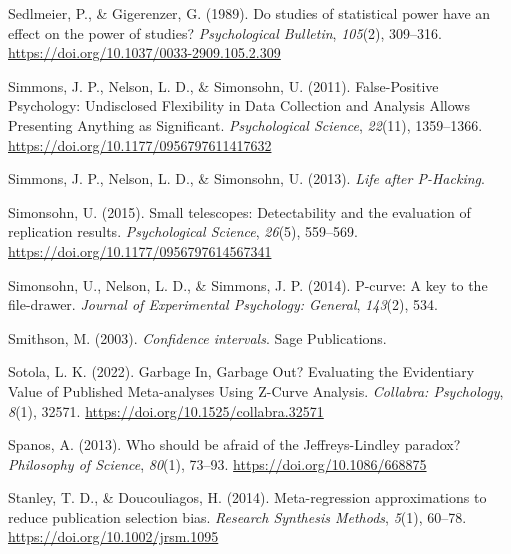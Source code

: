 \documentclass[
  letterpaper,
  DIV=11,
  numbers=noendperiod]{scrreprt}
\newlength{\cslhangindent}
\newlength{\cslentryspacingunit} %
\newenvironment{CSLReferences}[2] %
 {%
  \setlength{\parindent}{0pt}
  \ifodd #1
  \let\oldpar\par
  \def\par{\hangindent=\cslhangindent\oldpar}
  \fi
  \setlength{\parskip}{#2\cslentryspacingunit}
 }%
 {}
\begin{document}
\begin{CSLReferences}{1}{0}
\leavevmode{}%
Sedlmeier, P., \& Gigerenzer, G. (1989). Do studies of statistical power
have an effect on the power of studies? \emph{Psychological Bulletin},
\emph{105}(2), 309--316.
\url{https://doi.org/10.1037/0033-2909.105.2.309}

\leavevmode{}%
Simmons, J. P., Nelson, L. D., \& Simonsohn, U. (2011). False-{Positive
Psychology}: {Undisclosed Flexibility} in {Data Collection} and
{Analysis Allows Presenting Anything} as {Significant}.
\emph{Psychological Science}, \emph{22}(11), 1359--1366.
\url{https://doi.org/10.1177/0956797611417632}

\leavevmode{}%
Simmons, J. P., Nelson, L. D., \& Simonsohn, U. (2013). \emph{Life after
{P-Hacking}}.

\leavevmode{}%
Simonsohn, U. (2015). Small telescopes: {Detectability} and the
evaluation of replication results. \emph{Psychological Science},
\emph{26}(5), 559--569. \url{https://doi.org/10.1177/0956797614567341}

\leavevmode{}%
Simonsohn, U., Nelson, L. D., \& Simmons, J. P. (2014). P-curve: {A} key
to the file-drawer. \emph{Journal of Experimental Psychology: General},
\emph{143}(2), 534.

\leavevmode{}%
Smithson, M. (2003). \emph{Confidence intervals}. {Sage Publications}.

\leavevmode{}%
Sotola, L. K. (2022). Garbage {In}, {Garbage Out}? {Evaluating} the
{Evidentiary Value} of {Published Meta-analyses Using Z-Curve Analysis}.
\emph{Collabra: Psychology}, \emph{8}(1), 32571.
\url{https://doi.org/10.1525/collabra.32571}

\leavevmode{}%
Spanos, A. (2013). Who should be afraid of the {Jeffreys-Lindley}
paradox? \emph{Philosophy of Science}, \emph{80}(1), 73--93.
\url{https://doi.org/10.1086/668875}

\leavevmode{}%
Stanley, T. D., \& Doucouliagos, H. (2014). Meta-regression
approximations to reduce publication selection bias. \emph{Research
Synthesis Methods}, \emph{5}(1), 60--78.
\url{https://doi.org/10.1002/jrsm.1095}


\end{CSLReferences}
\end{document}
